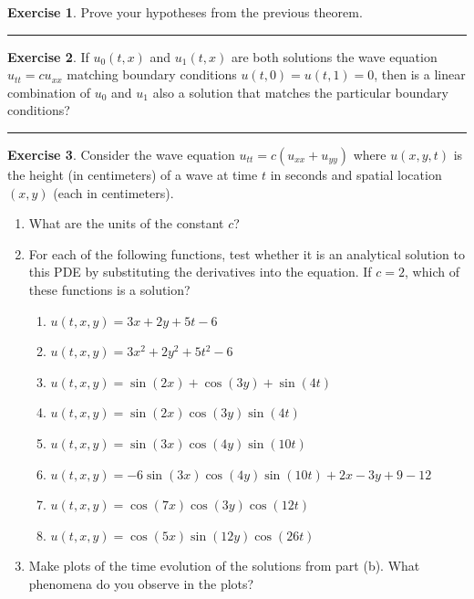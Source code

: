 \documentclass[
]{book}
\providecommand{\tightlist}{%
  \setlength{\itemsep}{0pt}\setlength{\parskip}{0pt}}
\theoremstyle{definition}
\theoremstyle{definition}
\theoremstyle{definition}
\newtheorem{exercise}{Exercise}[chapter]
\theoremstyle{remark}
\begin{document}
\begin{exercise}
\protect\hypertarget{exr:unnamed-chunk-534}{}{\label{exr:unnamed-chunk-534} }Prove your hypotheses from the previous theorem.
\end{exercise}

\begin{center}\rule{0.5\linewidth}{0.5pt}\end{center}

\begin{exercise}
\protect\hypertarget{exr:unnamed-chunk-535}{}{\label{exr:unnamed-chunk-535} }If \(u_0(t,x)\) and \(u_1(t,x)\) are both solutions the wave equation \(u_{tt} = c u_{xx}\) matching boundary conditions \(u(t,0) = u(t,1) = 0\), then is a linear combination of \(u_0\) and \(u_1\) also a solution that matches the particular boundary conditions?
\end{exercise}

\begin{center}\rule{0.5\linewidth}{0.5pt}\end{center}

\begin{exercise}
\protect\hypertarget{exr:unnamed-chunk-536}{}{\label{exr:unnamed-chunk-536} }Consider the wave equation \(u_{tt} = c ( u_{xx} + u_{yy})\) where \(u(x,y,t)\) is the height (in centimeters) of a wave at time \(t\) in seconds and spatial location \((x,y)\) (each in centimeters).

\begin{enumerate}
\def\labelenumi{\alph{enumi}.}
\tightlist
\item
  What are the units of the constant \(c\)?
\item
  For each of the following functions, test whether it is an analytical solution to this PDE by substituting the derivatives into the equation. If \(c = 2\), which of these functions is a solution?

  \begin{enumerate}
  \def\labelenumii{\roman{enumii}.}
  \tightlist
  \item
    \(u(t,x,y) = 3x + 2y + 5 t - 6\)
  \item
    \(u(t,x,y) = 3x^2 + 2y^2 + 5 t^2 - 6\)
  \item
    \(u(t,x,y) = \sin( 2 x) + \cos(3 y) + \sin(4t)\)
  \item
    \(u(t,x,y) = \sin( 2 x) \cos(3 y) \sin(4t)\)
  \item
    \(u(t,x,y) = \sin(3 x) \cos(4 y) \sin(10t)\)
  \item
    \(u(t,x,y) = -6\sin( 3 x) \cos(4 y) \sin(10t)+2x -3y+9-12\)
  \item
    \(u(t,x,y) = \cos(7 x) \cos(3 y) \cos(12t)\)
  \item
    \(u(t,x,y) = \cos(5 x) \sin(12 y) \cos(26t)\)
  \end{enumerate}
\item
  Make plots of the time evolution of the solutions from part (b). What phenomena do you observe in the plots?
\end{enumerate}
\end{exercise}
\end{document}
